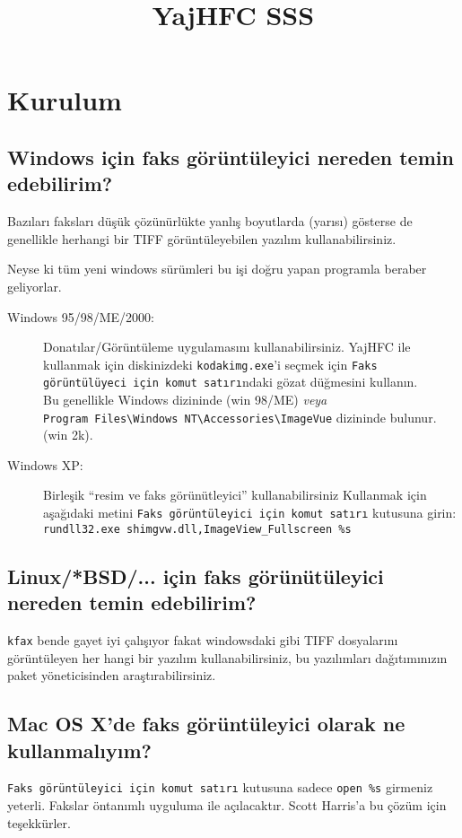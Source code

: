 \documentclass[a4paper,10pt]{scrartcl}
\title{YajHFC SSS}
\author{}
\date{}
\begin{document}
\maketitle

\tableofcontents

\section{Kurulum}
\subsection{Windows için faks görüntüleyici nereden temin edebilirim?}

Bazıları faksları düşük çözünürlükte yanlış boyutlarda (yarısı) gösterse de 
genellikle herhangi bir TIFF görüntüleyebilen yazılım kullanabilirsiniz.

Neyse ki tüm yeni windows sürümleri bu işi doğru yapan programla beraber geliyorlar.

\begin{description}
\item[Windows 95/98/ME/2000:]
Donatılar/Görüntüleme uygulamasını kullanabilirsiniz.
	YajHFC ile kullanmak için diskinizdeki \texttt{kodakimg.exe}'i seçmek için 
	\texttt{Faks görüntülüyeci için komut satırı}ndaki gözat düğmesini kullanın.\\
	Bu genellikle Windows dizininde (win 98/ME) \emph{veya} \\
\verb.Program Files\Windows NT\Accessories\ImageVue. dizininde bulunur. (win 2k). 
       
\item[Windows XP:]
Birleşik ``resim ve faks görünütleyici'' kullanabilirsiniz
	Kullanmak için aşağıdaki metini \texttt{Faks görüntüleyici için komut satırı} kutusuna girin:\\
	\verb#rundll32.exe shimgvw.dll,ImageView_Fullscreen %s#
 \end{description}

      
\subsection{Linux/*BSD/... için faks görünütüleyici nereden temin edebilirim?}
\texttt{kfax} bende gayet iyi çalışıyor fakat windowsdaki gibi TIFF dosyalarını görüntüleyen
her hangi bir yazılım kullanabilirsiniz, bu yazılımları dağıtımınızın paket yöneticisinden araştırabilirsiniz.


\subsection{Mac OS X'de faks görüntüleyici olarak ne kullanmalıyım?}
\texttt{Faks görüntüleyici için komut satırı} kutusuna sadece \verb.open %s. girmeniz yeterli.
Fakslar öntanımlı uyguluma ile açılacaktır.
Scott Harris'a bu çözüm için teşekkürler.
\end{document}
